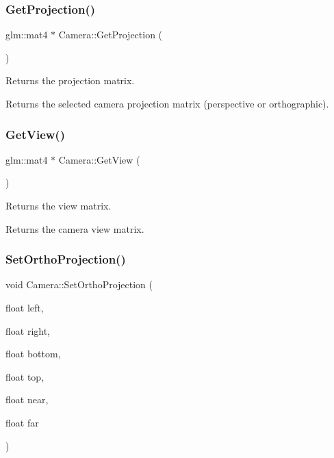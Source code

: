 \subsubsection{\texorpdfstring{Get\+Projection()}{GetProjection()}}
{\footnotesize\ttfamily glm\+::mat4 $\ast$ Camera\+::\+Get\+Projection (\begin{DoxyParamCaption}{ }\end{DoxyParamCaption})}



Returns the projection matrix. 

Returns the selected camera projection matrix (perspective or orthographic). \mbox{\label{class_camera_a7a1951025a21533f97f06071df681f7b}} 
\subsubsection{\texorpdfstring{Get\+View()}{GetView()}}
{\footnotesize\ttfamily glm\+::mat4 $\ast$ Camera\+::\+Get\+View (\begin{DoxyParamCaption}{ }\end{DoxyParamCaption})}



Returns the view matrix. 

Returns the camera view matrix. \mbox{\label{class_camera_aaee3d9ca2a77a31574da1e927047af84}} 
\subsubsection{\texorpdfstring{Set\+Ortho\+Projection()}{SetOrthoProjection()}}
{\footnotesize\ttfamily void Camera\+::\+Set\+Ortho\+Projection (\begin{DoxyParamCaption}\item[{float}]{left,  }\item[{float}]{right,  }\item[{float}]{bottom,  }\item[{float}]{top,  }\item[{float}]{near,  }\item[{float}]{far }\end{DoxyParamCaption})}



